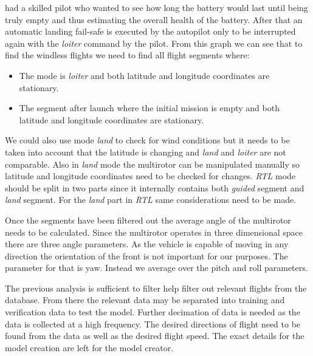 \documentclass[12pt,oneside]{reedthesis}
\theoremstyle{definition}
\theoremstyle{definition}
\theoremstyle{definition}
\theoremstyle{remark}
\begin{document}
had a skilled pilot who wanted to see how long the battery would last
until being truly empty and thus estimating the overall health of the
battery. After that an automatic landing fail-safe is executed by the
autopilot only to be interrupted again with the \emph{loiter} command by
the pilot. From this graph we can see that to find the windless flights
we need to find all flight segments where:
\begin{itemize}
\item
  The mode is \emph{loiter} and both latitude and longitude coordinates
  are stationary.
\item
  The segment after launch where the initial mission is empty and both
  latitude and longitude coordinates are stationary.
\end{itemize}
We could also use mode \emph{land} to check for wind conditions but it
needs to be taken into account that the latitude is changing and
\emph{land} and \emph{loiter} are not comparable. Also in \emph{land}
mode the multirotor can be manipulated manually so latitude and
longitude coordinates need to be checked for changes. \emph{RTL} mode
should be split in two parts since it internally contains both
\emph{guided} segment and \emph{land} segment. For the \emph{land} part
in \emph{RTL} same considerations need to be made.

Once the segments have been filtered out the average angle of the
multirotor needs to be calculated. Since the multirotor operates in
three dimensional space there are three angle parameters. As the vehicle
is capable of moving in any direction the orientation of the front is
not important for our purposes. The parameter for that is yaw. Instead
we average over the pitch and roll parameters.

The previous analysis is sufficient to filter help filter out relevant
flights from the database. From there the relevant data may be separated
into training and verification data to test the model. Further
decimation of data is needed as the data is collected at a high
frequency. The desired directions of flight need to be found from the
data as well as the desired flight speed. The exact details for the
model creation are left for the model creator.
\end{document}
